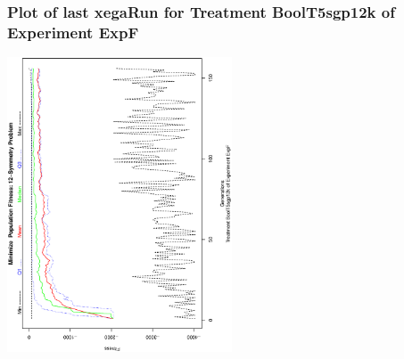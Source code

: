  \begin{frame}
 \frametitle{ Plot of last xegaRun for Treatment BoolT5sgp12k of Experiment ExpF }
 \begin{center}
\includegraphics[width=0.5\textwidth, angle=-90]
{ExpFPlotPopStatsFigure010.eps}
 \end{center}
 \label{report/ExpFPlotPopStatsFigure010.eps}  
 \end{frame}

